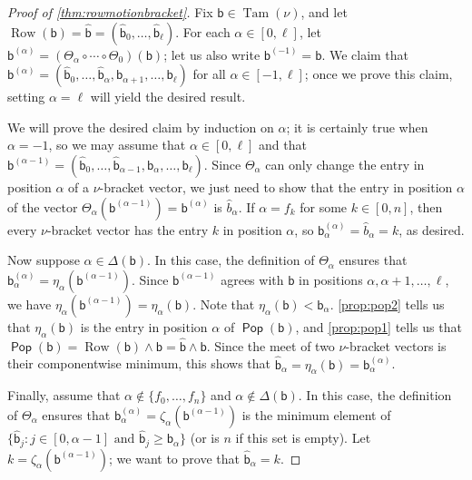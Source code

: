 \documentclass[11pt]{amsart}
\DeclareMathOperator{\Pop}{\mathsf{Pop}}
\theoremstyle{definition}
\DeclareMathOperator{\Tam}{Tam}
\DeclareMathOperator{\row}{Row}
\begin{document}
\begin{proof}[Proof of \cref{thm:rowmotionbracket}]
Fix $\mathsf{b}\in\Tam(\nu)$, and let $\row(\mathsf{b})=\widehat{\mathsf b}=(\widehat{\mathsf b}_0,\ldots,\widehat{\mathsf b}_\ell)$. For each $\alpha\in[0,\ell]$, let $\mathsf b^{(\alpha)}=(\Theta_{\alpha}\circ\cdots\circ\Theta_0)(\mathsf b)$; let us also write ${\mathsf b}^{(-1)}=\mathsf b$. We claim that ${\mathsf b}^{(\alpha)}=(\widehat{\mathsf b}_0,\ldots,\widehat{\mathsf b}_{\alpha},\mathsf b_{\alpha+1},\ldots,\mathsf b_\ell)$ for all $\alpha\in[-1,\ell]$; once we prove this claim, setting $\alpha=\ell$ will yield the desired result. 

We will prove the desired claim by induction on $\alpha$; it is certainly true when $\alpha=-1$, so we may assume that $\alpha\in[0,\ell]$ and that ${\mathsf b}^{(\alpha-1)}=(\widehat{\mathsf b}_0,\ldots,\widehat{\mathsf b}_{\alpha-1},\mathsf b_{\alpha},\ldots,\mathsf b_\ell)$. Since $\Theta_\alpha$ can only change the entry in position $\alpha$ of a $\nu$-bracket vector, we just need to show that the entry in position $\alpha$ of the vector $\Theta_\alpha(\mathsf{b}^{(\alpha-1)})={\mathsf b}^{(\alpha)}$ is $\widehat b_{\alpha}$. If $\alpha=f_k$ for some $k\in[0,n]$, then every $\nu$-bracket vector has the entry $k$ in position $\alpha$, so ${\mathsf b}^{(\alpha)}_\alpha=\widehat b_{\alpha}=k$, as desired. 

Now suppose $\alpha\in\Delta(\mathsf b)$. In this case, the definition of $\Theta_\alpha$ ensures that ${\mathsf b}^{(\alpha)}_\alpha=\eta_\alpha(\mathsf b^{(\alpha-1)})$. Since $\mathsf b^{(\alpha-1)}$ agrees with $\mathsf b$ in positions $\alpha,\alpha+1,\ldots,\ell$, we have $\eta_\alpha(\mathsf b^{(\alpha-1)})=\eta_\alpha(\mathsf b)$.
Note that $\eta_\alpha(\mathsf b)<\mathsf b_\alpha$. \cref{prop:pop2} tells us that $\eta_\alpha(\mathsf b)$ is the entry in position $\alpha$ of $\Pop(\mathsf b)$, and \cref{prop:pop1} tells us that $\Pop(\mathsf b)=\row(\mathsf b)\wedge\mathsf b=\widehat{\mathsf b}\wedge\mathsf b$. Since the meet of two $\nu$-bracket vectors is their componentwise minimum, this shows that $\widehat{\mathsf b}_\alpha=\eta_\alpha(\mathsf b)={\mathsf b}^{(\alpha)}_\alpha$.   

Finally, assume that $\alpha\not\in\{f_0,\ldots,f_n\}$ and $\alpha\not\in\Delta(\mathsf b)$. In this case, the definition of $\Theta_\alpha$ ensures that ${\mathsf b}^{(\alpha)}_\alpha=\zeta_\alpha(\mathsf b^{(\alpha-1)})$ is the minimum element of $\{\widehat {\mathsf b}_j:j\in[0,\alpha-1]\text{ and }\widehat {\mathsf{b}}_j\geq\mathsf b_\alpha\}$ (or is $n$ if this set is empty). Let $k=\zeta_\alpha(\mathsf b^{(\alpha-1)})$; we want to prove that $\widehat {\mathsf b}_\alpha=k$. 


\end{proof}
\end{document}
